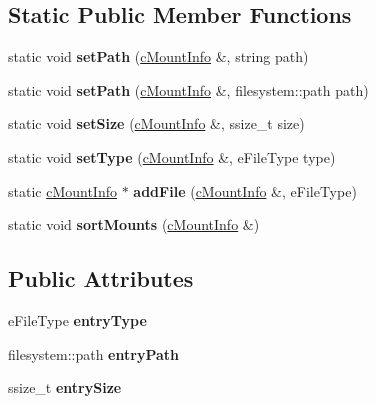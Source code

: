 \subsection*{\-Static \-Public \-Member \-Functions}
\begin{DoxyCompactItemize}
\item 
\hypertarget{classcMountInfo_a73d0efc6da4fd3c07acd9a8e500faac4}{static void {\bfseries set\-Path} (\hyperlink{classcMountInfo}{c\-Mount\-Info} \&, string path)}\label{d7/d18/classcMountInfo_a73d0efc6da4fd3c07acd9a8e500faac4}

\item 
\hypertarget{classcMountInfo_a8bbce14d7375ba7c09e7b30ee19bbe3a}{static void {\bfseries set\-Path} (\hyperlink{classcMountInfo}{c\-Mount\-Info} \&, filesystem\-::path path)}\label{d7/d18/classcMountInfo_a8bbce14d7375ba7c09e7b30ee19bbe3a}

\item 
\hypertarget{classcMountInfo_aa3fa521adbe386fa8a327b515ae15d6f}{static void {\bfseries set\-Size} (\hyperlink{classcMountInfo}{c\-Mount\-Info} \&, ssize\-\_\-t size)}\label{d7/d18/classcMountInfo_aa3fa521adbe386fa8a327b515ae15d6f}

\item 
\hypertarget{classcMountInfo_a0ac01041a1f7e65a23e138033fb8c4d8}{static void {\bfseries set\-Type} (\hyperlink{classcMountInfo}{c\-Mount\-Info} \&, e\-File\-Type type)}\label{d7/d18/classcMountInfo_a0ac01041a1f7e65a23e138033fb8c4d8}

\item 
\hypertarget{classcMountInfo_a5bc9493c54685a90b96525b5dbee7d4d}{static \hyperlink{classcMountInfo}{c\-Mount\-Info} $\ast$ {\bfseries add\-File} (\hyperlink{classcMountInfo}{c\-Mount\-Info} \&, e\-File\-Type)}\label{d7/d18/classcMountInfo_a5bc9493c54685a90b96525b5dbee7d4d}

\item 
\hypertarget{classcMountInfo_a4a8965b26d3cc92610de7f0db164c057}{static void {\bfseries sort\-Mounts} (\hyperlink{classcMountInfo}{c\-Mount\-Info} \&)}\label{d7/d18/classcMountInfo_a4a8965b26d3cc92610de7f0db164c057}

\end{DoxyCompactItemize}
\subsection*{\-Public \-Attributes}
\begin{DoxyCompactItemize}
\item 
\hypertarget{classcMountInfo_a5ccfba3b945fa785dcae4c22e655e804}{e\-File\-Type {\bfseries entry\-Type}}\label{d7/d18/classcMountInfo_a5ccfba3b945fa785dcae4c22e655e804}

\item 
\hypertarget{classcMountInfo_ab7a61cb3c40f4222f290d161260d37e1}{filesystem\-::path {\bfseries entry\-Path}}\label{d7/d18/classcMountInfo_ab7a61cb3c40f4222f290d161260d37e1}

\item 
\hypertarget{classcMountInfo_ac4145e903e7a5668c49e40113476482c}{ssize\-\_\-t {\bfseries entry\-Size}}\label{d7/d18/classcMountInfo_ac4145e903e7a5668c49e40113476482c}

\end{DoxyCompactItemize}
